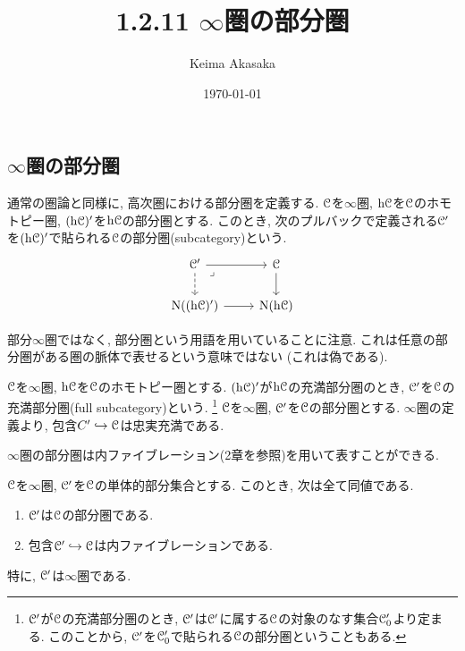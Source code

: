 \documentclass[uplatex, a4paper, 14Q, dvipdfmx]{jsreport}
\title{1.2.11 \texorpdfstring{$\infty$}{infty}圏の部分圏}
\author{Keima Akasaka}
\date{\today}
\begin{document}

\setcounter{chapter}{1}
\setcounter{section}{2} 
\setcounter{subsection}{10}   
\setcounter{subsubsection}{1}

\subsection{\texorpdfstring{$\infty$}{infty}圏の部分圏}

通常の圏論と同様に, 高次圏における部分圏を定義する. 
$\mathcal{C}$を$\infty$圏, $\mathrm{h}\mathcal{C}$を$\mathcal{C}$のホモトピー圏, $(\mathrm{h}\mathcal{C})'$を$\mathrm{h}\mathcal{C}$の部分圏とする. 
このとき, 次のプルバックで定義される$\mathcal{C}'$を$(\mathrm{h}\mathcal{C})'$で貼られる$\mathcal{C}$の部分圏(subcategory)という. 
\[\begin{tikzcd}
  {\C'} & \C \\
  {\N((\h\C)')} & {\N(\h\C)}
  \arrow[from=1-1, to=1-2]
  \arrow[dashed, from=1-1, to=2-1]
  \arrow[from=1-2, to=2-2]
  \arrow[from=2-1, to=2-2]
  \arrow["\lrcorner"{anchor=center, pos=0.125}, draw=none, from=1-1, to=2-2]
\end{tikzcd}\]

\begin{remark} \label{rem.1.2.11.1}
  部分$\infty$圏ではなく, 部分圏という用語を用いていることに注意. 
  これは任意の部分圏がある圏の脈体で表せるという意味ではない (これは偽である). 
\end{remark}

$\mathcal{C}$を$\infty$圏, $\mathrm{h}\mathcal{C}$を$\mathcal{C}$のホモトピー圏とする. 
$(\mathrm{h}\mathcal{C})'$が$\mathrm{h}\mathcal{C}$の充満部分圏のとき, $\mathcal{C}'$を$\mathcal{C}$の充満部分圏(full subcategory)という. 
\footnote{
  $\mathcal{C}'$が$\mathcal{C}$の充満部分圏のとき, $\mathcal{C}'$は$\mathcal{C}'$に属する$\mathcal{C}$の対象のなす集合$\mathcal{C}'_0$より定まる. 
  このことから, $\mathcal{C}'$を$\mathcal{C}'_0$で貼られる$\mathcal{C}$の部分圏ということもある. 
}
$\mathcal{C}$を$\infty$圏, $\mathcal{C}'$を$\mathcal{C}$の部分圏とする. 
$\infty$圏の定義より, 包含$C' \hookrightarrow \mathcal{C}$は忠実充満である. 

$\infty$圏の部分圏は内ファイブレーション(2章を参照)を用いて表すことができる.

\begin{lemma} \label{prop.subcategory_equal_inner_fibration}
  $\mathcal{C}$を$\infty$圏, $\mathcal{C}'$を$\mathcal{C}$の単体的部分集合とする. 
  このとき, 次は全て同値である. 
  \begin{enumerate}
    \item $\mathcal{C}'$は$\mathcal{C}$の部分圏である. 
    \item 包含$\mathcal{C}' \hookrightarrow \mathcal{C}$は内ファイブレーションである. 
  \end{enumerate}
  特に, $\mathcal{C}'$は$\infty$圏である. 
\end{lemma}
\end{document}
